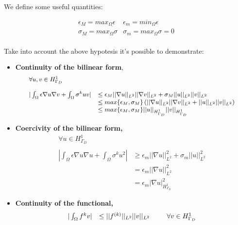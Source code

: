 We define some useful quantities:

\begin{equation*}
\begin{array}{ll}
\epsilon_M = max_{\Omega} \epsilon & \epsilon_m = min_{\Omega} \epsilon \\
\sigma_M = max_{\Omega} \sigma & \sigma_m = max_{\Omega} \sigma = 0 \\
\end{array}
\end{equation*}

Take into account the above hypotesis it's possible to demonstrate:
\begin{itemize}
\item \textbf{Continuity of the bilinear form},
\begin{equation*}
\small
\begin{array}{ll}
\forall u,v \in H^1_{\Gamma_D} &\\ \\
|\int_{\Omega} \epsilon \nabla u \nabla v + \int_{\Omega} \sigma^{k}u v| 
& \leq \epsilon_{M} ||\nabla u ||_{L^2} || \nabla v ||_{L^2} +  \sigma_{M} ||u ||_{L^2} ||v ||_{L^2} 
\\
& \leq max\{\epsilon_{M}, \sigma_{M} \}  
\left( ||\nabla u ||_{L^2} || \nabla v ||_{L^2} +   ||u ||_{L^2} ||v ||_{L^2} \right)
\\
& \leq max\{\epsilon_{M}, \sigma_{M} \}  
||u ||_{H^1_{\Gamma_D}} || v ||_{H^1_{\Gamma_D}}
\end{array}
\end{equation*}

\item \textbf{Coercivity of the bilinear form,}
\begin{equation*}
\begin{array}{ll}
\forall u \in H^1_{\Gamma_D} &\\ \\
|\int_{\Omega} \epsilon \nabla u \nabla u + \int_{\Omega} \sigma^{k}u^2| 
& \geq \epsilon_{m} ||\nabla u ||_{L^2}^2  +  \sigma_{m} ||u ||_{L^2}^2 
\\
& =  \epsilon_{m} ||\nabla u ||_{L^2}^2 
\\
& = \epsilon_{m} |\nabla u |_{H^1_{\Gamma_D}}^2 
\end{array}
\end{equation*}

\item \textbf{Continuity of the functional,}
\begin{equation*}
\begin{array}{ll}
|\int_{\Omega} f^{k} v |
& \leq ||f^{(k)} ||_{L^2}||v ||_{L^2} \psp{15} \forall v \in H^1_{\Gamma_D}
\end{array}
\end{equation*}
\end{itemize}

